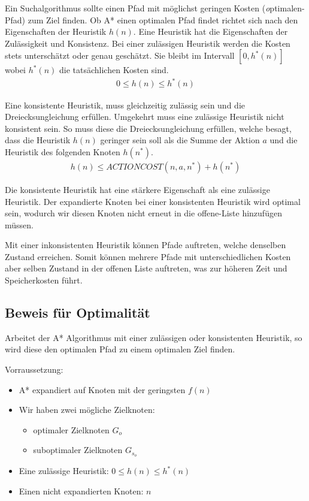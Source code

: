 Ein Suchalgorithmus sollte einen Pfad mit möglichst geringen Kosten (\textit optimalen-Pfad) zum Ziel finden. Ob A* einen optimalen Pfad findet richtet sich nach den Eigenschaften der Heuristik $h(n)$. Eine Heuristik hat die Eigenschaften der Zulässigkeit und Konsistenz.
Bei einer zulässigen Heuristik werden die Kosten stets unterschätzt oder genau geschätzt. Sie bleibt im Intervall $[0, h^{\ast}(n)]$ wobei $h^{\ast}(n)$ die tatsächlichen Kosten sind.
\begin{align*}
0 \leq h(n) \leq h^*(n)
\end{align*}

Eine konsistente Heuristik, muss gleichzeitig zulässig sein und die Dreiecksungleichung erfüllen. Umgekehrt muss eine zulässige Heuristik nicht konsistent sein. So muss diese die Dreiecksungleichung erfüllen, welche besagt, dass die Heuristik $h(n)$ geringer sein soll als die Summe der Aktion $a$ und die Heuristik des folgenden Knoten $h(n^*)$. 
\begin{align*}
h(n) \leq ACTIONCOST(n,a,n^*) + h(n^*)
\end{align*}

Die konsistente Heuristik hat eine stärkere Eigenschaft als eine zulässige Heuristik. Der expandierte Knoten bei einer konsistenten Heuristik wird optimal sein, wodurch wir diesen Knoten nicht erneut in die offene-Liste hinzufügen müssen.

Mit einer inkonsistenten Heuristik können Pfade auftreten, welche denselben Zustand erreichen. Somit können mehrere Pfade mit unterschiedlichen Kosten aber selben Zustand in der offenen Liste auftreten, was zur höheren Zeit und Speicherkosten führt.

\subsection{Beweis für Optimalität}

Arbeitet der A* Algorithmus mit einer zulässigen oder konsistenten Heuristik, so wird diese den optimalen Pfad zu einem optimalen Ziel finden.

Vorraussetzung:
\begin{itemize}
\item A* expandiert auf Knoten mit der geringsten $f(n)$
\item Wir haben zwei mögliche Zielknoten:
\begin{itemize}
	\item optimaler Zielknoten $G_o$
	\item suboptimaler Zielknoten $G_s_o$
\end{itemize}
\item Eine zulässige Heuristik: $0 \leq h(n) \leq h^*(n)$
\item Einen nicht expandierten Knoten: $n$
\end{itemize}

